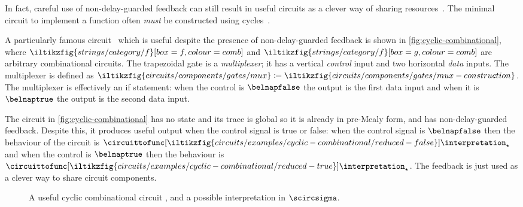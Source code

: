 \documentclass{lmcs}
\begin{document}
In fact, careful use of non-delay-guarded feedback can still result in useful
circuits as a clever way of sharing
resources~\cite{malik1994analysis,riedel2004cyclic,mendler2012constructive}.
The minimal circuit to implement a function often \emph{must} be
constructed using cycles~\cite{rivest1977necessity,riedel2003synthesis}.

\begin{exa}\label{ex:cyclic-combinational}
    A particularly famous circuit~\cite{malik1994analysis} which is useful
    despite the presence of non-delay-guarded feedback is shown in
    \autoref{fig:cyclic-combinational}, where \(
    \iltikzfig{strings/category/f}[box=f,colour=comb]
    \) and \(
    \iltikzfig{strings/category/f}[box=g,colour=comb]
    \) are arbitrary combinational circuits.
    The trapezoidal gate is a \emph{multiplexer}; it has a vertical
    \emph{control} input and two horizontal \emph{data} inputs.
    The multiplexer is defined as \(
    \iltikzfig{circuits/components/gates/mux}
    \coloneqq
    \iltikzfig{circuits/components/gates/mux-construction}
    \).
    The multiplexer is effectively an if statement: when the control is
    \(\belnapfalse\) the output is the first data input and when it is
    \(\belnaptrue\) the output is the second data input.

    The circuit in \autoref{fig:cyclic-combinational} has no state and its trace is
    global so it is already in pre-Mealy form, and has
    non-delay-guarded feedback.
    Despite this, it produces useful output when the control signal is true or
    false:
    when the control signal is \(\belnapfalse\) then the behaviour of the
    circuit is \(
    \circuittofunc[
        \iltikzfig{circuits/examples/cyclic-combinational/reduced-false}
    ]{\interpretation_\star}
    \) and when the control is \(\belnaptrue\) then the behaviour is \(
    \circuittofunc[
        \iltikzfig{circuits/examples/cyclic-combinational/reduced-true}
    ]{\interpretation_\star}
    \).
    The feedback is just used as a clever way to share circuit components.
\end{exa}

\begin{figure}
    \centering
    \quad
    \caption{
        A useful cyclic combinational circuit
        \cite[Fig. 1]{mendler2012constructive}, and a possible interpretation in
        \(\scircsigma\).
    }
    \label{fig:cyclic-combinational}
\end{figure}
\end{document}
